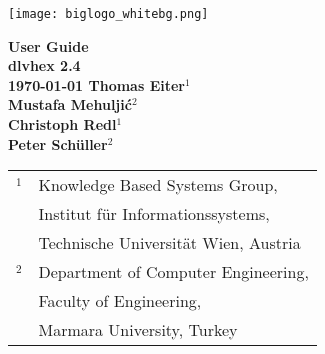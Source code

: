 \documentclass[a4paper, titlepage]{article}
\begin{document}
\setcounter{page}{3}
\newcommand{\dlvhex}{{\sc dlvhex}}
\newcommand{\hex}{{\sc hex}}
\newcommand{\dlv}{{\sc dlv}}
\newcommand{\dlvdb}{{\sc dlvdb}}
\newcommand{\libdlv}{{\sc libdlv}}
\newcommand{\libclingo}{{\sc libclingo}}
\newcommand{\genuineii}{{\sc genuineii}}
\newcommand{\genuinegi}{{\sc genuinegi}}
\newcommand{\genuineic}{{\sc genuineic}}
\newcommand{\genuinegc}{{\sc genuinegc}}

\setcounter{secnumdepth}{4} %
\setcounter{tocdepth}{4}    %

\newtheorem{exmp}{Example}[section]


\begin{titlepage}
    \centering
    \vfill
    \texttt{[image: biglogo\_whitebg.png]}
    \vfill
    {\bfseries\Large
        {\Huge User Guide} \\
        {\Large \dlvhex{} 2.4} \\
        \vskip0.5cm
	    {\Large \today}        
        \vskip4cm
        Thomas Eiter$^1$\\[1cm]
        Mustafa Mehulji\'{c}$^2$ \\[1cm]
        Christoph Redl$^1$ \\[1cm]
        Peter Sch\"{u}ller$^2$ \\[1cm]
        \vspace{2cm}
        {
        \large\mdseries
        \begin{tabular}{r@{}l}
        {\Large$^1$}
          & Knowledge Based Systems Group,\\
          & Institut f\"ur Informationssystems,\\
          & Technische Universit\"at Wien, Austria \\[1ex]
        {\Large$^2$}
          & Department of Computer Engineering,\\
          & Faculty of Engineering, \\
          & Marmara University, Turkey \\
        \end{tabular}
        }
        \vspace{4cm}
    }    
    
\end{titlepage}
%
%
\end{document}
